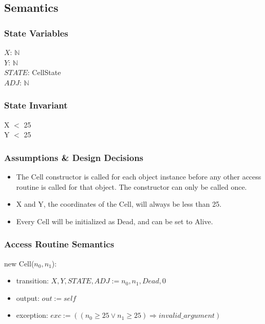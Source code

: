 \documentclass[12pt]{article}
\begin{document}
\subsection* {Semantics}

\subsubsection* {State Variables}

$X$: $\mathbb{N}$\\
$Y$: $\mathbb{N}$\\
$STATE$: CellState\\
$ADJ$: $\mathbb{N}$

\subsubsection* {State Invariant}
X $<$ 25\\
Y $<$ 25

\subsubsection* {Assumptions \& Design Decisions}

\begin{itemize}
\item The Cell constructor is called for each object instance before any
  other access routine is called for that object.  The constructor can only be
  called once.

\item X and Y, the coordinates of the Cell, will always be less than 25.

\item Every Cell will be initialized as Dead, and can be set to Alive.
\end{itemize}

\subsubsection* {Access Routine Semantics}

new Cell($n_0, n_1$):
\begin{itemize}
\item transition: $X, Y, STATE, ADJ := n_0, n_1, Dead, 0$
\item output: $\mathit{out} := \mathit{self}$
\item exception: $exc := ((n_0 \ge 25 \vee n_1 \ge 25) \Rightarrow \mathit{invalid\_argument})$
\end{itemize}
\end{document}
